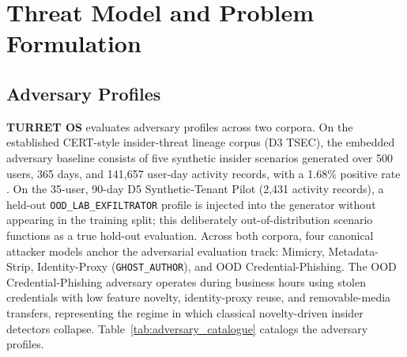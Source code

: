 \section{Threat Model and Problem Formulation}
\label{sec:threat_model}

\subsection{Adversary Profiles}

\textbf{TURRET OS} evaluates adversary profiles across two corpora. On the established CERT-style insider-threat lineage corpus (D3 TSEC), the embedded adversary baseline consists of five synthetic insider scenarios generated over 500 users, 365 days, and 141,657 user-day activity records, with a 1.68\% positive rate \citep{wei2024ewatcher, xiao2024sentinel, gao2023dtgi}. On the 35-user, 90-day D5 Synthetic-Tenant Pilot (2,431 activity records), a held-out \texttt{OOD\_\allowbreak LAB\_\allowbreak EXFILTRATOR} profile is injected into the generator without appearing in the training split; this deliberately out-of-distribution scenario functions as a true hold-out evaluation. Across both corpora, four canonical attacker models anchor the adversarial evaluation track: Mimicry, Metadata-Strip, Identity-Proxy (\texttt{GHOST\_\allowbreak AUTHOR}), and OOD Credential-Phishing. The OOD Credential-Phishing adversary operates during business hours using stolen credentials with low feature novelty, identity-proxy reuse, and removable-media transfers, representing the regime in which classical novelty-driven insider detectors collapse. Table~\ref{tab:adversary_catalogue} catalogs the adversary profiles.

